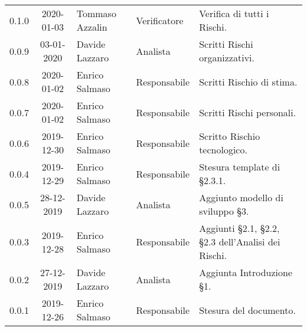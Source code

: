 {\begin{longtable}{ c c  C{4cm}  C{3cm} C{4cm}}
0.1.0 & 2020-01-03 & Tommaso Azzalin & Verificatore & Verifica di tutti i Rischi.  \\
0.0.9 & 03-01-2020 & Davide Lazzaro & Analista & Scritti Rischi organizzativi. \\
0.0.8 & 2020-01-02 &  Enrico Salmaso & Responsabile & Scritti Rischio di stima. \\
0.0.7 & 2020-01-02 & Enrico Salmaso & Responsabile & Scritti Rischi personali. \\
0.0.6 & 2019-12-30 & Enrico Salmaso & Responsabile & Scritto Rischio tecnologico. \\
0.0.4 & 2019-12-29 & Enrico Salmaso & Responsabile & Stesura template di §2.3.1.\\
0.0.5 & 28-12-2019 & Davide Lazzaro & Analista & Aggiunto modello di sviluppo §3.\\
0.0.3 & 2019-12-28 & Enrico Salmaso & Responsabile & Aggiunti §2.1, §2.2, §2.3 dell'Analisi dei Rischi. \\
0.0.2 & 27-12-2019 & Davide Lazzaro & Analista & Aggiunta Introduzione §1. \\
0.0.1 & 2019-12-26 & Enrico Salmaso & Responsabile & Stesura del documento.  \\
		
\end{longtable}
}